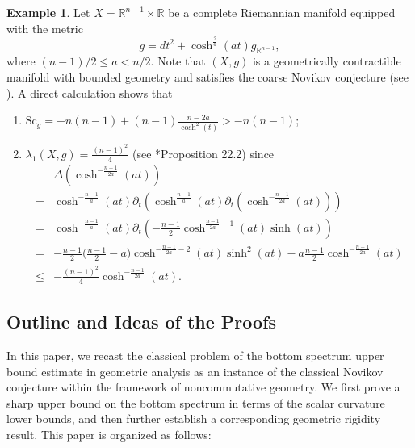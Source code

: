 \documentclass[12pt, reqno]{amsart}
\theoremstyle{plain}%
\theoremstyle{definition}
\newtheorem{example}[theorem]{Example}
\theoremstyle{remark}
\numberwithin{equation}{section}
\newcommand{\Sc}{\mathrm{Sc}}
\newcommand{\R}{\mathbb{R}}
\begin{document}
\begin{example}\label{example}
	Let $X=\R^{n-1}\times\R$ be a  complete Riemannian manifold equipped with the metric
	$$g = dt^2 + \cosh^{\frac{2}{a}}(at)g_{\mathbb{R}^{n-1}},$$
	where $(n-1)/2\leq a<n/2$.
	Note that $(X, g)$ is a geometrically contractible manifold with bounded geometry and satisfies the coarse Novikov conjecture (see \cite[Chapter 7]{willett2020higher}).
	A direct calculation shows that
	\begin{enumerate}
		\item $\displaystyle\Sc_g = -n(n-1) + (n-1)\frac{n-2a}{\cosh^2(t)}> -n(n-1)$;
		\item $\lambda_1(X, g) = \frac{(n-1)^2}{4}$ (see \cite{Li_geometric_analysis}*{Proposition 22.2}) since 
		\begin{align*}
			&\Delta (\cosh^{- \frac{n-1}{2a}}(at))\\
			=& \cosh^{-\frac{n-1}{a}}(at)\partial_t( \cosh^{\frac{n-1}{a}}(at)\partial_t (\cosh^{-\frac{n-1}{2a}}(at))) \\
			=& \cosh^{-\frac{n-1}{a}}(at)\partial_t(-\frac{
				n-1}{2}\cosh^{\frac{n-1}{2a}-1}(at) \sinh(at)
			)\\
			=&-\frac{n-1}{2}\big(\frac{n-1}{2}-a\big)\cosh^{-\frac{n-1}{2a}-2}(at)\sinh^2(at)-a\frac{n-1}{2}\cosh^{-\frac{n-1}{2a}}(at)\\
			\leq& 
			-\frac{(n-1)^2}{4}\cosh^{- \frac{n-1}{2a}}(at).
		\end{align*}
        
	\end{enumerate}


\end{example}



\vspace{2mm}









\subsection*{Outline and Ideas of the Proofs}

In this paper, we recast the classical problem of the bottom spectrum upper bound estimate in geometric analysis as an instance of the classical Novikov conjecture within the framework of noncommutative geometry. We first prove a sharp upper bound on the bottom spectrum in terms of the scalar curvature lower bounds, and then further establish a corresponding geometric rigidity result. This paper is organized as follows:
\end{document}
